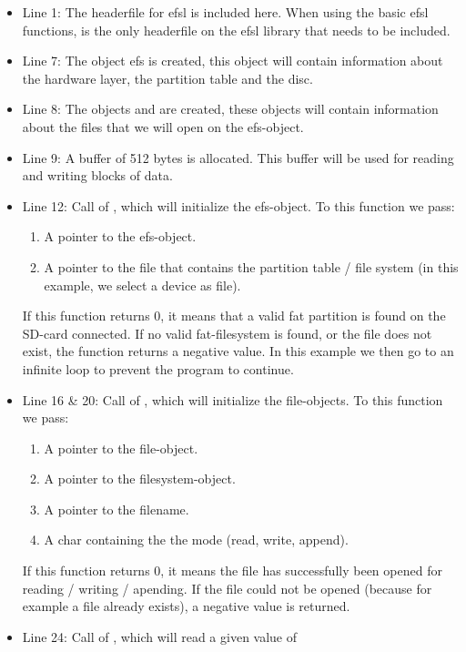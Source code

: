 \begin{itemize}
	\item{Line 1: The headerfile for efsl is included here. When using the
		basic efsl functions,  is the only headerfile on the efsl
		library that needs to be included.}
	\item{Line 7: The object efs is created, this object will contain
		information about the hardware layer, the partition table and
		the disc.}
	\item{Line 8: The objects  and  are created, these objects 
		will contain information about the files that we will open on the 
		efs-object.}
	\item{Line 9: A buffer of 512 bytes is allocated. This buffer will be
		used for reading and writing blocks of data.}
	\item{Line 12: Call of , which will initialize the efs-object.
		To this function we pass:
		\begin{enumerate}
			\item{A pointer to the efs-object.}
			\item{A pointer to the file that contains the partition table /
				file system (in this example, we select a device as file).}
		\end{enumerate}
		If this function returns 0, it means that a valid fat partition is
		found on the SD-card connected.
		If no valid fat-filesystem is found, or the file does not exist, the
		function returns a negative value. In this example we then go to an
		infinite loop to prevent the program to continue.}
	\item{Line 16 \& 20: Call of , which will initialize the
		file-objects. To this function we pass:
		\begin{enumerate}
			\item{A pointer to the file-object.}
			\item{A pointer to the filesystem-object.}
			\item{A pointer to the filename.}
			\item{A char containing the the mode (read, write, append).}
		\end{enumerate}
		If this function returns 0, it means the file has successfully been
		opened for reading / writing / apending.
	 	If the file could not be opened (because for example a file already 
		exists), a negative value is returned.}
	\item{Line 24: Call of , which will read a given value of
}
\end{itemize}
